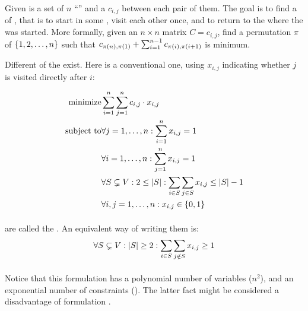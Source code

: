 \begin{definition}
Given is a set of $n$ ``'' and a  $c_{i,j}$ between each pair of them. The goal is to find a  of , that is to start in some , visit each other  once, and to return to the  where the  was started. More formally, given an $n\times n$ matrix $C=c_{i,j}$, find a permutation $\pi$ of $\accl{1,2,\ldots,n}$ such that $c_{\fun{\pi}{n},\fun{\pi}{1}}+\isumieqb[i]{1}{n-1}{c_{\fun{\pi}{i},\fun{\pi}{i+1}}}$ is minimum.
\end{definition}

Different  of the  exist. Here is a conventional one, using  $x_{i,j}$ indicating whether  $j$ is visited directly after  $i$:

\begin{eqnarray}
\mbox{minimize}&\sumieqb[i]{1}{n}{\sumieqb[j]{1}{n}{c_{i,j}\cdot x_{i,j}}}\eqnlab{tsp-m}\\
\mbox{subject to}&\forall\rangei[j]{1}{n}:\sumieqb[i]{1}{n}{x_{i,j}}=1\eqnlab{tsp-c1}\\
&\forall\rangei[i]{1}{n}:\sumieqb[j]{1}{n}{x_{i,j}}=1\eqnlab{tsp-c2}\\
&\forall S\subsetneq V:2\leq\abs{S}:\sumdomain[i]{S}{\sumdomain[j]{S}{x_{i,j}}}\leq\abs{S}-1\eqnlab{tsp-c3}\\
&\forall\rangei[i,j]{1}{n}:x_{i,j}\in\accl{0,1}\eqnlab{tsp-c4}
\end{eqnarray}

\paragraph{}
 are called the . An equivalent way of writing them is:
\begin{equation}
\forall S\subsetneq V:\abs{S}\geq 2:\sumdomain[i]{S}{\sumndomain[j]{S}{x_{i,j}}}\geq 1
\end{equation}

\paragraph{}
Notice that this formulation has a polynomial number of variables ($n^2$), and an exponential number of constraints (). The latter fact might be considered a disadvantage of formulation .

